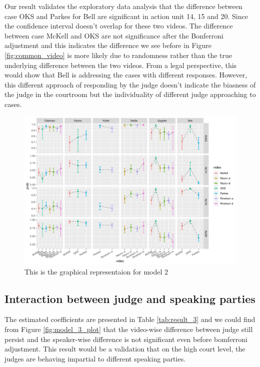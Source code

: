 \documentclass{monashthesis}
\begin{document}
Our result validates the exploratory data analysis that the difference between case OKS and Parkes for Bell are significant in action unit 14, 15 and 20. Since the confidence interval doesn't overlap for these two videos. The difference between case McKell and OKS are not significance after the Bonferroni adjustment and this indicates the difference we see before in Figure \ref{fig:common_video} is more likely due to randomness rather than the true underlying difference between the two videos. From a legal perspective, this would show that Bell is addressing the cases with different responses. However, this different approach of responding by the judge doesn't indicate the biasness of the judge in the courtroom but the individuality of different judge approaching to cases.

\begin{figure}

{\centering \includegraphics[width=1\linewidth]{figures/unnamed-chunk-11-1} 

}

\caption{This is the graphical representaion for model 2\label{fig:model_2_plot}}\label{fig:unnamed-chunk-11}
\end{figure}

\hypertarget{interaction-between-judge-and-speaking-parties}{%
\subsection{Interaction between judge and speaking parties}\label{interaction-between-judge-and-speaking-parties}}

The estimated coefficients are presented in Table \ref{tab:result_3} and we could find from Figure \ref{fig:model_3_plot} that the video-wise difference between judge still persist and the speaker-wise difference is not significant even before bomferroni adjustment. This result would be a validation that on the high court level, the judges are behaving impartial to different speaking parties.
\end{document}

